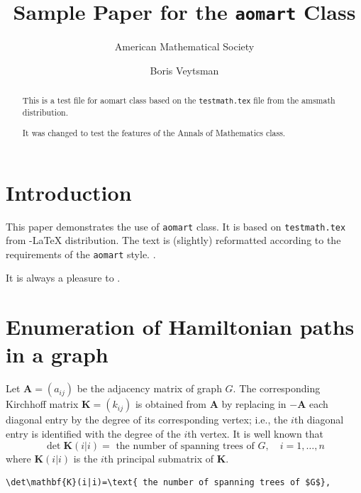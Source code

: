 \documentclass[manuscript, printscheme]{aomart}
\title[Sample Paper]{Sample Paper for the \texttt{aomart}
  Class}
\author[AMS]{American Mathematical Society}
\author{Boris Veytsman}
\newtheorem[{}\it]{thm}{Theorem}[section]
\theoremstyle{definition}
\newtheorem*[{}\it]{notation}{Notation}
\begin{document}
\begin{abstract}
  This is a test file for \textsf{aomart} class based on the
  \texttt{testmath.tex} file from the \textsf{amsmath} distri\-bution.  

  It was changed to test the features of the Annals of Mathematics
  class. 
\end{abstract}

\maketitle
\tableofcontents

\section{Introduction}


This paper demonstrates the use of \texttt{aomart} class.  It is based
on \texttt{testmath.tex} from  \AmS-\LaTeX{} distribution.  The text
is (slightly) reformatted according to the requirements of the
\texttt{aomart} style.  
\cite{Lenstra74,Zarhin92,Minasyan08,Arnold89:MathMethodsMechanics,%
Michal48,Michal38,Zarhin:AG,Zarhin:AC,degroot1992stochastic}.


It is always a pleasure to .  

\section{Enumeration of Hamiltonian paths in a graph}

Let $\mathbf{A}=(a_{ij})$ be the adjacency matrix of graph $G$. The
corresponding Kirchhoff matrix $\mathbf{K}=(k_{ij})$ is obtained from
$\mathbf{A}$ by replacing in $-\mathbf{A}$ each diagonal entry by the
degree of its corresponding vertex; i.e., the $i$th diagonal entry is
identified with the degree of the $i$th vertex. It is well known that
\begin{equation}
\det\mathbf{K}(i|i)=\text{ the number of spanning trees of $G$},
\quad i=1,\dots,n
\end{equation}
where $\mathbf{K}(i|i)$ is the $i$th principal submatrix of
$\mathbf{K}$.
\begin{verbatim}
\det\mathbf{K}(i|i)=\text{ the number of spanning trees of $G$},
\end{verbatim}
\end{document}

